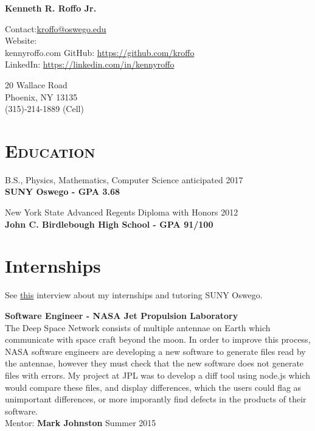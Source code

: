 \documentclass[8pt]{article}
\def\name{Kenneth R. Roffo Jr.}
\renewenvironment{itemize}{
  \begin{list}{}{
    \setlength{\leftmargin}{1.5em}
  }
}{
  \end{list}
}
\begin{document}
{\huge \bf \name}


Contact:\large \href{mailto:kroffo@oswego.edu}{kroffo@oswego.edu}\\
Website: \href{http://kennyroffo.com}\\{kennyroffo.com}
GitHub: \href{https://github.com/kroffo}{https://github.com/kroffo}\\
LinkedIn: \href{https://www.linkedin.com/in/kennyroffo}{https://linkedin.com/in/kennyroffo}\\

\vspace{0.15in}

20 Wallace Road \\
Phoenix, NY 13135 \\
(315)-214-1889 (Cell)


\section*{\textsc{Education}}

\begin{itemize}
  \item B.S., Physics, Mathematics, Computer Science \hfill anticipated 2017\\
  \textbf{SUNY Oswego - GPA 3.68}
  \item New York State Advanced Regents Diploma with Honors \hfill 2012\\
  \textbf{John C. Birdlebough High School - GPA 91/100}
  \end{itemize}	

\section*{Internships} See \href{https://www.youtube.com/watch?v=BiJOjhm_ov4}{this} interview about my internships and tutoring SUNY Oswego.
\begin{itemize}
\item \textbf{Software Engineer - NASA Jet Propulsion Laboratory}\\
  The Deep Space Network consists of multiple antennae on Earth which communicate with space craft beyond the moon. In order to improve this process, NASA software engineers are developing a new software to generate files read by the antennae, however they must check that the new software does not generate files with errors. My project at JPL was to develop a diff tool using node.js which would compare these files, and display differences, which the users could flag as unimportant differences, or more imporantly find defects in the products of their software.\\
  Mentor: \textbf{Mark Johnston} \hfill Summer 2015


\end{itemize}
\end{document}
